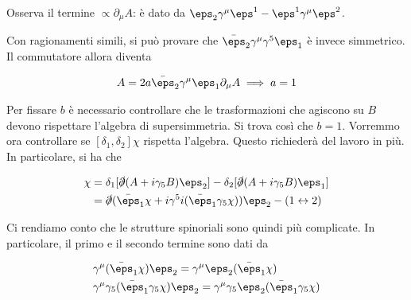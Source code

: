\documentclass{report}
\begin{document}
Osserva il termine \(\propto \partial_\mu A\): è dato da \(\eps_2 \gamma^\mu \eps^1 - \eps^1 \gamma^\mu \eps^2\). 



Con ragionamenti simili, si può provare che \(\bar{\eps}_2 \gamma^\mu \gamma^5 \eps_1\) è invece simmetrico. Il commutatore allora diventa 

\begin{align}
    [\delta_{\eps_1}, \delta_{\eps_2}]A = 2a \bar{\eps}_2 \gamma^\mu \eps_1 \partial_\mu A \implies a = 1
\end{align}

Per fissare \(b\) è necessario controllare che le trasformazioni che agiscono su \(B\) devono rispettare l'algebra di supersimmetria. Si trova così che \(b=1\). Vorremmo ora controllare se \([\delta_1, \delta_2]\chi\) rispetta l'algebra. Questo richiederà del lavoro in più. In particolare, si ha che 

\begin{align}
    [\delta_1, \delta_2]\chi &= \delta_1 [\slashed{\partial}(A+i\gamma_5 B)\eps_2] - \delta_2 [\slashed{\partial}(A+i\gamma_5B)\eps_1] \notag \\ 
    &= \slashed{\partial}(\bar{\eps}_1 \chi + i\gamma^5 i (\bar{\eps}_1 \gamma_5 \chi))\eps_2 - (1 \leftrightarrow 2)
\end{align}

Ci rendiamo conto che le strutture spinoriali sono quindi più complicate. In particolare, il primo e il secondo termine sono dati da 

\begin{align}
    &\gamma^\mu (\bar{\eps}_1 \chi)\eps_2 = \gamma^\mu \eps_2 (\bar{\eps}_1 \chi) \notag \\
    &\gamma^\mu \gamma_5 (\bar{\eps}_1 \gamma_5 \chi)\eps_2 = \gamma^\mu \gamma_5 \eps_2 (\bar{\eps}_1 \gamma_5 \chi) 
\end{align}
\end{document}
